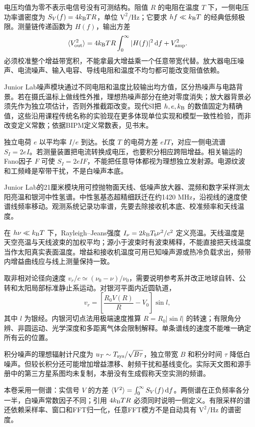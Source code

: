 电压均值为零不表示电信号没有可测结构。阻值 $R$ 的电阻在温度 $T$ 下，一侧电压功率谱密度为 $S_V(f)=4k_{\mathrm B} TR$，单位 $\mathrm{V^2/Hz}$；它要求 $hf\ll k_{\mathrm B} T$ 的经典低频极限。测量链传递函数为 $H(f)$，输出方差
\[
\langle V_{\rm out}^2\rangle=4k_{\mathrm B} TR\int_0^\infty|H(f)|^2\,\mathrm d f+V_{\rm amp}^2.
\]
必须校准整个增益带宽积，不能拿最大增益乘一个任意带宽代替。放大器电压噪声、电流噪声、输入电容、导线电阻和温度不均匀都可能改变阻值依赖。

Junior Lab噪声模块通过不同电阻和温度比较输出均方值，区分热噪声与电路背景。若在摄氏温标上做线性外推，理想热噪声部分在绝对零度消失；放大器背景必须先作为独立项估计，否则外推截距改变。现代SI把 $h,e,k_{\mathrm B}$ 的数值固定为精确值，这些沿用课程传统名称的实验现在更多体现单位实现和模型一致性检验，而非改变定义常数；依据BIPM定义常数表，见书末。

独立电荷 $e$ 以平均率 $I/e$ 到达。长度 $T$ 的电荷方差 $eIT$，对应一侧电流谱 $S_I=2eI$。若测量装置把电流转换成电压，也要积分相应跨阻增益。相关输运的Fano因子 $F$ 可使 $S_I=2eIF$，不能把任意导体都视为理想独立发射源。电源纹波和工频峰是窄带干扰，不是白噪声本底。

Junior Lab的21厘米模块用可控抛物面天线、低噪声放大器、混频和数字采样测太阳亮温和银河中性氢谱。中性氢基态超精细跃迁在约1420 MHz，沿视线的速度使谱线频率移动。观测系统记录功率谱，先要去除接收机本底、校准频率和天线温度。

在 $h\nu\ll k_{\mathrm B} T$ 下，Rayleigh--Jeans强度 $I_\nu=2k_{\mathrm B} T_b\nu^2/c^2$ 定义亮温。天线温度是天空亮温与天线波束的加权平均；源小于波束时有波束稀释，不能直接把天线温度当作太阳真实表面温度。增益和接收机温度可用已知噪声源或热冷负载求出，频带内增益曲线应与线上测量保持一致。

取非相对论径向速度 $v_r/c\simeq(\nu_0-\nu)/\nu_0$，需要说明参考系并改正地球自转、公转和太阳局部标准静止系运动。对银河平面内近圆轨道，
\[
v_r=\left[\frac{R_0V(R)}R-V_0\right]\sin l,
\]
其中 $l$ 为银经。内银河切点法用极端速度推算 $R=R_0|\sin l|$ 的转速；有限角分辨、非圆运动、光学深度和多距离气体会限制解释。单条谱线的速度不能唯一确定所有云的位置。

积分噪声的理想辐射计尺度为 $u_T\sim T_{\rm sys}/\sqrt{B\tau}$，独立带宽 $B$ 和积分时间 $\tau$ 降低白噪声。但较长积分还可能增加增益漂移、射频干扰和基线变化。实际天文图和源手册中的第三方星系图均未复制，本册没有生成假称天空实测的频谱。

本卷采用一侧谱：实信号 $V$ 的方差 $\langle V^2\rangle=\int_0^\infty S_V(f)\,\mathrm d f$。两侧谱在正负频率各分一半，白噪声常数因子不同；引用 $4k_{\mathrm B} TR$ 必须同时说明一侧定义。有限采样的谱还依赖采样率、窗口和FFT归一化，任意FFT模方不是自动具有 $\mathrm{V^2/Hz}$ 的谱密度。

